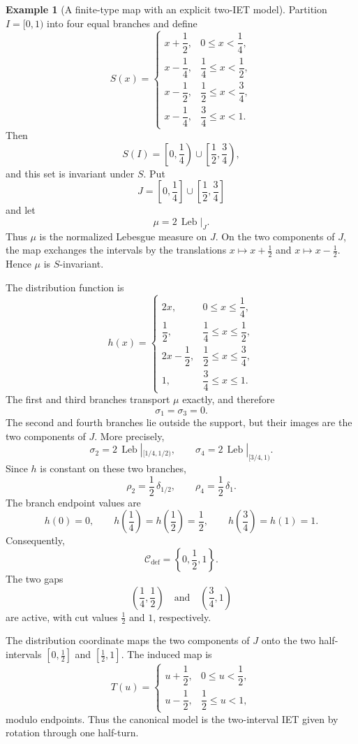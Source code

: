 \documentclass[11pt]{amsart}
\theoremstyle{plain}
\theoremstyle{definition}
\newtheorem{example}[theorem]{Example}
\theoremstyle{remark}
\DeclareMathOperator{\Leb}{Leb}
\newcommand{\cC}{\mathcal C}
\begin{document}
\begin{example}[A finite-type map with an explicit two-IET model]
\label{ex:explicit-finite-type}
Partition $I=[0,1)$ into four equal branches and define
\[
S(x)=
\begin{cases}
 x+\dfrac12, & 0\le x<\dfrac14,\\[2mm]
 x-\dfrac14, & \dfrac14\le x<\dfrac12,\\[2mm]
 x-\dfrac12, & \dfrac12\le x<\dfrac34,\\[2mm]
 x-\dfrac14, & \dfrac34\le x<1.
\end{cases}
\]
Then
\[
S(I)=
\left[0,\frac14\right)
\cup
\left[\frac12,\frac34\right),
\]
and this set is invariant under $S$. Put
\[
J=\left[0,\frac14\right]
\cup
\left[\frac12,\frac34\right]
\]
and let
\[
\mu=2\,\Leb|_J.
\]
Thus $\mu$ is the normalized Lebesgue measure on $J$. On the two components of $J$, the
map exchanges the intervals by the translations $x\mapsto x+\frac12$ and
$x\mapsto x-\frac12$. Hence $\mu$ is $S$-invariant.

The distribution function is
\[
h(x)=
\begin{cases}
 2x, & 0\le x\le \dfrac14,\\[1mm]
 \dfrac12, & \dfrac14\le x\le \dfrac12,\\[1mm]
 2x-\dfrac12, & \dfrac12\le x\le \dfrac34,\\[1mm]
 1, & \dfrac34\le x\le 1.
\end{cases}
\]
The first and third branches transport $\mu$ exactly, and therefore
\[
\sigma_1=\sigma_3=0.
\]
The second and fourth branches lie outside the support, but their images are the two
components of $J$. More precisely,
\[
\sigma_2=2\,\Leb|_{[1/4,1/2)},
\qquad
\sigma_4=2\,\Leb|_{[3/4,1)}.
\]
Since $h$ is constant on these two branches,
\[
\rho_2=\frac12\,\delta_{1/2},
\qquad
\rho_4=\frac12\,\delta_1.
\]
The branch endpoint values are
\[
h(0)=0,
\qquad
h\left(\frac14\right)=h\left(\frac12\right)=\frac12,
\qquad
h\left(\frac34\right)=h(1)=1.
\]
Consequently,
\[
\cC_{\mathrm{def}}=\left\{0,\frac12,1\right\}.
\]
The two gaps
\[
\left(\frac14,\frac12\right)
\quad\text{and}\quad
\left(\frac34,1\right)
\]
are active, with cut values $\frac12$ and $1$, respectively.

The distribution coordinate maps the two components of $J$ onto the two half-intervals
$[0,\frac12]$ and $[\frac12,1]$. The induced map is
\[
T(u)=
\begin{cases}
 u+\dfrac12, & 0\le u<\dfrac12,\\[2mm]
 u-\dfrac12, & \dfrac12\le u<1,
\end{cases}
\]
modulo endpoints. Thus the canonical model is the two-interval IET given by rotation
through one half-turn.
\end{example}
\end{document}
